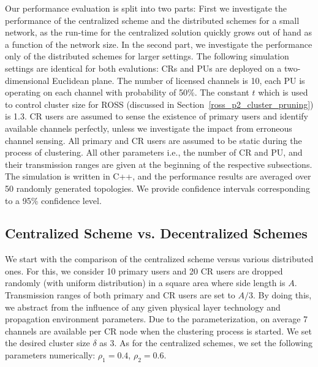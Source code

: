\documentclass[times]{ettauth}
\newcommand{\ie}{i.e., }
\theoremstyle{mytheoremstyle}
\theoremstyle{mytheoremstyle}
\theoremstyle{mytheoremstyle}
\begin{document}
Our performance evaluation is split into two parts:
First we investigate the performance of the centralized scheme and the distributed schemes for a small network, as the run-time for the centralized solution quickly grows out of hand as a function of the network size.
In the second part, we investigate the performance only of the distributed schemes for larger settings.
The following simulation settings are identical for both evalutions:
CRs and PUs are deployed on a two-dimensional Euclidean plane.
The number of licensed channels is 10, each PU is operating on each channel with probability of 50\%.
The constant $t$ which is used to control cluster size for ROSS (discussed in Section~\ref{ross_p2_cluster_pruning}) is 1.3.
CR users are assumed to sense the existence of primary users and identify available channels perfectly, unless we investigate the impact from erroneous channel sensing.
All primary and CR users are assumed to be static during the process of clustering.
All other parameters \ie the number of CR and PU, and their transmission ranges are given at the beginning of the respective subsections.
The simulation is written in C++, and the performance results are averaged over 50 randomly generated topologies.
We provide confidence intervals corresponding to a 95\% confidence level.

\subsection{Centralized Scheme vs. Decentralized Schemes}
We start with the comparison of the centralized scheme versus various distributed ones.
For this, we consider 10 primary users and 20 CR users are dropped randomly (with uniform distribution) in a square area where side length is $A$.
Transmission ranges of both primary and CR users are set to $A/3$.
By doing this, we abstract from the influence of any given physical layer technology and propagation environment parameters.
Due to the parameterization, on average 7 channels are available per CR node when the clustering process is started.
We set the desired cluster size $\delta$ as 3.
As for the centralized schemes, we set the following parameters numerically: $\rho_1 =  0.4$, $\rho_2 =  0.6$.
\end{document}
